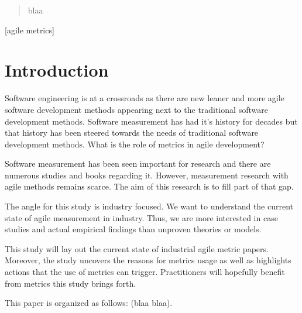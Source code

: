 \documentclass{sig-alternate}
\begin{document}
\date{30 July 1999}

\maketitle
\begin{abstract}
blaa
\end{abstract}

[agile metrics]



\section{Introduction}

Software engineering is at a crossroads as there are new leaner and more
agile software development methods appearing next to the traditional
software development methods. Software measurement has had it's history for
decades but that history has been steered towards the needs of traditional
software development methods. What is the role of metrics in agile
development?

Software measurement has been seen important for research and there are
numerous studies and books regarding it. However, measurement research with
agile methods remains scarce. The aim of this research is to fill part of that
gap.

The angle for this study is industry focused. We want to understand the
current state of agile measurement in industry. Thus, we are more interested
in case studies and actual empirical findings than unproven theories or
models.

This study will lay out the current state of industrial agile metric papers.
Moreover, the study uncovers the reasons for metrics usage as well as
highlights actions that the use of metrics can trigger. Practitioners will
hopefully benefit from metrics this study brings forth.

This paper is organized as follows: (blaa blaa).
\end{document}
